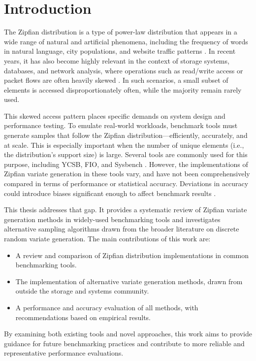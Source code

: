 
\chapter{Introduction}\label{chapter:introduction}

The Zipfian distribution is a type of power-law distribution that appears in a wide range of natural and artificial phenomena,
including the frequency of words in natural language, city populations, and website traffic patterns \cite{mandelbrotNatureFractal1998}.
In recent years, it has also become highly relevant in the context of storage systems, databases, and network analysis, where operations
 such as read/write access or packet flows are often heavily skewed \cite{grayQuicklyGeneratingBillionrecord1994, crovellaPerformanceEvaluationHeavy2000}. 
 In such scenarios, a small subset of elements is accessed disproportionately often, while the majority remain rarely used.

 This skewed access pattern places specific demands on system design and performance testing. 
 To emulate real-world workloads, benchmark tools must generate samples that follow the Zipfian distribution—efficiently, 
 accurately, and at scale. This is especially important when the number of unique elements (i.e., the distribution's support size) is large. 
 Several tools are commonly used for this purpose, including YCSB, FIO, and Sysbench \cite{NavigatingDatabasePerformance2024}. However, the implementations of 
 Zipfian variate generation in these tools vary, and have not been comprehensively compared in terms of performance or statistical accuracy. 
 Deviations in accuracy could introduce biases significant enough to affect benchmark results \cite{TailScale}.

 This thesis addresses that gap. It provides a systematic review of Zipfian variate generation methods in widely-used benchmarking tools 
 and investigates alternative sampling algorithms drawn from the broader literature on discrete random variate generation. 
 The main contributions of this work are:

\begin{itemize}
  \item A review and comparison of Zipfian distribution implementations in common benchmarking tools.
  \item The implementation of alternative variate generation methods, drawn from outside the storage and systems community.
  \item A performance and accuracy evaluation of all methods, with recommendations based on empirical results.
\end{itemize}

By examining both existing tools and novel approaches, 
this work aims to provide guidance for future benchmarking practices and 
contribute to more reliable and representative performance evaluations.
